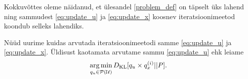 Kokkuvõttes oleme näidanud, et ülesandel \eqref{problem_def} on täpselt üks lahend ning sammudest \eqref{eq:update_u} ja \eqref{eq:update_x} koosnev iteratsioonimeetod koondub selleks lahendiks. 



\vspace{1 cm}
Nüüd uurime kuidas arvutada iteratsioonimeetodi samme \eqref{eq:update_u} ja \eqref{eq:update_x}.
Üldisust kaotamata arvutame sammu \eqref{eq:update_u} ehk leiame
$$ \operatorname*{arg\,min}_{q_u \in \mathcal{P}(\mathcal{U})} D_{\mathrm{KL}}[q_u \times q_x^{(i)} || P]. $$


